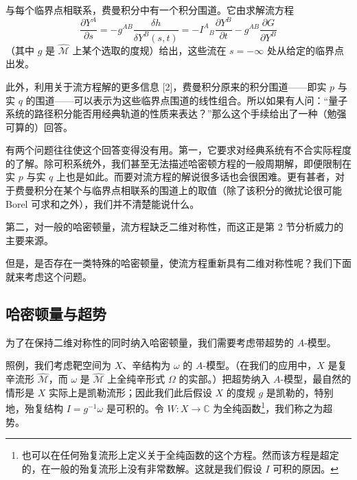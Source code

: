 \documentclass[11pt,a4paper,UTF8]{ctexart}
\theoremstyle{plain}
\theoremstyle{definition}
\begin{document}

与每个临界点相联系，费曼积分中有一个积分围道。它由求解流方程
\begin{equation}
    \frac{\partial Y^A}{\partial s}=-g^{AB}\frac{\delta h}{\delta Y^B(s,t)}=-I^A{}_B\frac{\partial Y^B}{\partial t}-g^{AB}\frac{\partial G}{\partial Y^B}
    \tag{3.8}
\end{equation}
（其中 $g$ 是 $\widehat{\mathcal{M}}$ 上某个选取的度规）给出，这些流在 $s=-\infty$ 处从给定的临界点出发。


此外，利用关于流方程解的更多信息 [2]，费曼积分原来的积分围道——即实 $p$ 与实 $q$ 的围道——可以表示为这些临界点围道的线性组合。所以如果有人问：“量子系统的路径积分能否用经典轨道的性质来表达？”那么这个手续给出了一种（勉强可算的）回答。

有两个问题往往使这个回答变得没有用。第一，它要求对经典系统有不合实际程度的了解。除可积系统外，我们甚至无法描述哈密顿方程的一般周期解，即便限制在实 $p$ 与实 $q$ 上也是如此。而要对流方程的解说很多话也会很困难。更有甚者，对于费曼积分在某个与临界点相联系的围道上的取值（除了该积分的微扰论很可能 Borel 可求和之外），我们并不清楚能说什么。

第二，对一般的哈密顿量，流方程缺乏二维对称性，而这正是第 2 节分析威力的主要来源。

但是，是否存在一类特殊的哈密顿量，使流方程重新具有二维对称性呢？我们下面就来考虑这个问题。

\subsection{哈密顿量与超势}

为了在保持二维对称性的同时纳入哈密顿量，我们需要考虑带超势的 $A$-模型。

照例，我们考虑靶空间为 $X$、辛结构为 $\omega$ 的 $A$-模型。（在我们的应用中，$X$ 是复辛流形 $\widehat{\mathcal{M}}$，而 $\omega$ 是 $\widehat{\mathcal{M}}$ 上全纯辛形式 $\Omega$ 的实部。）把超势纳入 $A$-模型，最自然的情形是 $X$ 实际上是凯勒流形；因此我们此后假设 $X$ 的度规 $g$ 是凯勒的，特别地，殆复结构 $I=g^{-1}\omega$ 是可积的。令 $W:X\to\mathbb{C}$ 为全纯函数\footnote{也可以在任何殆复流形上定义关于全纯函数的这个方程。然而该方程是超定的，在一般的殆复流形上没有非常数解。这就是我们假设 $I$ 可积的原因。}，我们称之为超势。
\end{document}
